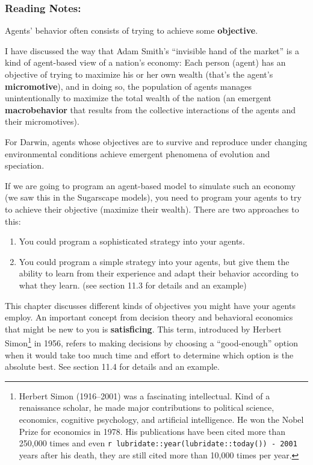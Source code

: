 \documentclass[
]{article}
\providecommand{\tightlist}{%
  \setlength{\itemsep}{0pt}\setlength{\parskip}{0pt}}
\begin{document}
\subsubsection{Reading Notes:}\label{reading-notes-10}

Agents' behavior often consists of trying to achieve some
\textbf{objective}.

I have discussed the way that Adam Smith's ``invisible hand of the
market'' is a kind of agent-based view of a nation's economy: Each
person (agent) has an objective of trying to maximize his or her own
wealth (that's the agent's \textbf{micromotive}), and in doing so, the
population of agents manages unintentionally to maximize the total
wealth of the nation (an emergent \textbf{macrobehavior} that results
from the collective interactions of the agents and their micromotives).

For Darwin, agents whose objectives are to survive and reproduce under
changing environmental conditions achieve emergent phenomena of
evolution and speciation.

If we are going to program an agent-based model to simulate such an
economy (we saw this in the Sugarscape models), you need to program your
agents to try to achieve their objective (maximize their wealth). There
are two approaches to this:

\begin{enumerate}
\def\labelenumi{\arabic{enumi}.}
\tightlist
\item
  You could program a sophisticated strategy into your agents.
\item
  You could program a simple strategy into your agents, but give them
  the ability to learn from their experience and adapt their behavior
  according to what they learn. (see section 11.3 for details and an
  example)
\end{enumerate}

This chapter discusses different kinds of objectives you might have your
agents employ. An important concept from decision theory and behavioral
economics that might be new to you is \textbf{satisficing}. This term,
introduced by Herbert Simon\footnote{Herbert Simon (1916--2001) was a
  fascinating intellectual. Kind of a renaissance scholar, he made major
  contributions to political science, economics, cognitive psychology,
  and artificial intelligence. He won the Nobel Prize for economics in
  1978. His publications have been cited more than 250,000 times and
  even \texttt{r\ lubridate::year(lubridate::today())\ -\ 2001} years
  after his death, they are still cited more than 10,000 times per year.}
in 1956, refers to making decisions by choosing a ``good-enough'' option
when it would take too much time and effort to determine which option is
the absolute best. See section 11.4 for details and an example.
\end{document}
